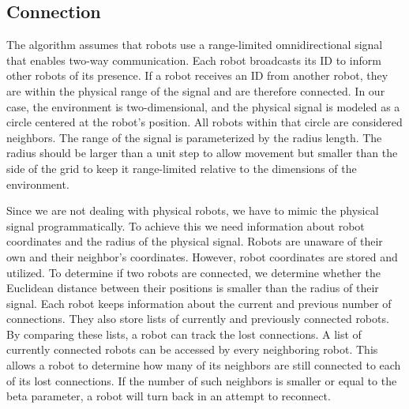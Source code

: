 \subsection{Connection}
The algorithm assumes that robots use a range-limited omnidirectional signal that enables two-way communication. Each robot broadcasts its ID to inform other robots of its presence. If a robot receives an ID from another robot, they are within the physical range of the signal and are therefore connected. In our case, the environment is two-dimensional, and the physical signal is modeled as a circle centered at the robot's position. All robots within that circle are considered neighbors. The range of the signal is parameterized by the radius length. The radius should be larger than a unit step to allow movement but smaller than the side of the grid to keep it range-limited relative to the dimensions of the environment.

Since we are not dealing with physical robots, we have to mimic the physical signal programmatically. To achieve this we need information about robot coordinates and the radius of the physical signal. Robots are unaware of their own and their neighbor's coordinates. However, robot coordinates are stored and utilized. To determine if two robots are connected, we determine whether the Euclidean distance between their positions is smaller than the radius of their signal. Each robot keeps information about the current and previous number of connections. They also store lists of currently and previously connected robots. By comparing these lists, a robot can track the lost connections. A list of currently connected robots can be accessed by every neighboring robot. This allows a robot to determine how many of its neighbors are still connected to each of its lost connections. If the number of such neighbors is smaller or equal to the beta parameter, a robot will turn back in an attempt to reconnect.


